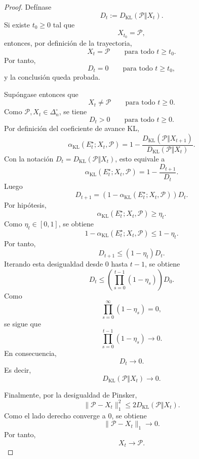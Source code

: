 \documentclass[12pt]{article}
\begin{document}
\begin{proof}
Defínase
\[
D_t:=D_{\mathrm{KL}}(\mathcal P\Vert X_t).
\]
Si existe \(t_0\geq 0\) tal que
\[
X_{t_0}=\mathcal P,
\]
entonces, por definición de la trayectoria,
\[
X_t=\mathcal P
\qquad
\text{para todo }t\geq t_0.
\]
Por tanto,
\[
D_t=0
\qquad
\text{para todo }t\geq t_0,
\]
y la conclusión queda probada.

Supóngase entonces que
\[
X_t\neq \mathcal P
\qquad
\text{para todo }t\geq 0.
\]
Como \(\mathcal P,X_t\in\Delta_n^\circ\), se tiene
\[
D_t>0
\qquad
\text{para todo }t\geq 0.
\]
Por definición del coeficiente de avance KL,
\[
\alpha_{\mathrm{KL}}(E_t^\star;X_t,\mathcal P)
=
1-
\frac{
D_{\mathrm{KL}}(\mathcal P\Vert X_{t+1})
}{
D_{\mathrm{KL}}(\mathcal P\Vert X_t)
}.
\]
Con la notación \(D_t=D_{\mathrm{KL}}(\mathcal P\Vert X_t)\), esto equivale a
\[
\alpha_{\mathrm{KL}}(E_t^\star;X_t,\mathcal P)
=
1-\frac{D_{t+1}}{D_t}.
\]
Luego
\[
D_{t+1}
=
\left(
1-\alpha_{\mathrm{KL}}(E_t^\star;X_t,\mathcal P)
\right)D_t.
\]
Por hipótesis,
\[
\alpha_{\mathrm{KL}}(E_t^\star;X_t,\mathcal P)\geq \eta_t.
\]
Como \(\eta_t\in[0,1]\), se obtiene
\[
1-\alpha_{\mathrm{KL}}(E_t^\star;X_t,\mathcal P)
\leq
1-\eta_t.
\]
Por tanto,
\[
D_{t+1}
\leq
(1-\eta_t)D_t.
\]
Iterando esta desigualdad desde \(0\) hasta \(t-1\), se obtiene
\[
D_t
\leq
\left(
\prod_{s=0}^{t-1}(1-\eta_s)
\right)D_0.
\]
Como
\[
\prod_{s=0}^{\infty}(1-\eta_s)=0,
\]
se sigue que
\[
\prod_{s=0}^{t-1}(1-\eta_s)\longrightarrow 0.
\]
En consecuencia,
\[
D_t\longrightarrow 0.
\]
Es decir,
\[
D_{\mathrm{KL}}(\mathcal P\Vert X_t)\longrightarrow 0.
\]

Finalmente, por la desigualdad de Pinsker,
\[
\|\mathcal P-X_t\|_1^2
\leq
2D_{\mathrm{KL}}(\mathcal P\Vert X_t).
\]
Como el lado derecho converge a \(0\), se obtiene
\[
\|\mathcal P-X_t\|_1\longrightarrow 0.
\]
Por tanto,
\[
X_t\longrightarrow \mathcal P.
\]
\end{proof}
\end{document}
